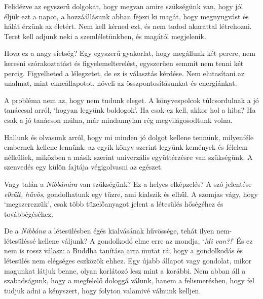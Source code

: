 Felidézve az egyszerű dolgokat, hogy megvan amire szükségünk van, hogy
jól éljük ezt a napot, a hozzáállásunk abban fejezi ki magát, hogy
megnyugvást és hálát érzünk az életért. Nem kell kérned ezt, és nem
tudod akarattal létrehozni. Teret kell adjunk neki a szemléletünkben, és
magától megjelenik.

Hova ez a nagy sietség? Egy egyszerű gyakorlat, hogy megállunk két
percre, nem keresni szórakoztatást és figyelemelterelést, egyszerűen
semmit nem tenni két percig. Figyelheted a lélegzetet, de ez is
választás kérdése. Nem elutasítani az unalmat, mint elmeállapotot,
növeli az összpontosításunkat és energiánkat.

\enlargethispage*{\baselineskip}

A probléma nem az, hogy nem tudunk eleget. A könyvespolcok túlcsordulnak
a jó tanáccsal arról, `hogyan legyünk boldogok'. Ha csak ez kell, akkor
hol a hiba? Ha csak a jó tanácson múlna, már mindannyian rég
megvilágosodtunk volna.

Hallunk és olvasunk arról, hogy mi minden jó
dolgot kellene tennünk, milyenféle embernek kellene lennünk: az egyik
könyv szerint legyünk kemények és félelem nélküliek, miközben a másik
szerint univerzális együttérzésre van szükségünk. A szenvedés egy külön
fajtája végigolvasni az egészet.

Vagy talán a \emph{Nibbánára} van szükségünk? Ez a helyes elképzelés? A
szó jelentése \emph{elhűlt, hűvös}, gondolhatunk egy tűzre, ami kialszik
és elhűl. A szomjas vágy, hogy `megszerezzük', csak több tüzelőanyagot
jelent a létesülés hőségéhez és továbbégéséhez.

De a \emph{Nibbána} a létesülésben égés kialvásának hűvössége, tehát
ilyen nem-létesüléssé kellene váljunk? A gondolkodó elme erre az mondja,
`\emph{Mi van?!}' És ez nem is rossz válasz: a Buddha tanítása arra
mutat rá, hogy a gondolkodás és létesülés nem elégséges eszközök ehhez.
Egy újabb állapot vagy gondolat, mikor magunkat látjuk benne, olyan
korlátozó lesz mint a korábbi. Nem abban áll a szabadságunk, hogy a
megfelelő dologgá válunk, hanem a felismerésben, hogy fel tudjuk adni a
kényszert, hogy folyton valamivé válnunk kelljen.

\clearpage
\figurepagelayout

